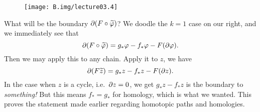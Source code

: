 \begin{wrapfigure}{r}{7pc}
  \vspace{-12pt}
  \centering
  \texttt{[image: B.img/lecture03.4]}
  \vspace{-12pt}
\end{wrapfigure}      
\noindent\ignorespaces %
What will be the boundary $\partial(F\circ\widetilde{\varphi})$?
We doodle the $k=1$ case on our right, and we immediately see
that
\begin{equation}
\partial(F\circ\widetilde{\varphi})=g_{*}\varphi-f_{*}\varphi-F(\partial\varphi).
\end{equation}
Then we may apply this to any chain. Apply it to $z$, we have
\begin{equation}
\partial(F\widetilde{z})=g_{*}z-f_{*}z-F(\partial z).
\end{equation}
In the case when $z$ is a cycle, i.e.\ $\partial z=0$, we get
$g_{*}z-f_{*}z$ is the boundary to \emph{something!} But this
means $f_{*}=g_{*}$ for homology, which is what we wanted.\hfill\qedsymbol\break
\medskip
This proves the statement made earlier regarding homotopic paths
and homologies.
